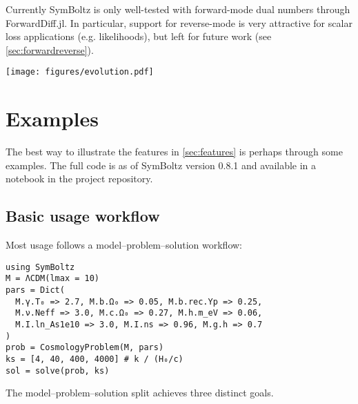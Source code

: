 \documentclass{aa}
\begin{document}
Currently SymBoltz is only well-tested with forward-mode dual numbers through ForwardDiff.jl.
In particular, support for reverse-mode is very attractive for scalar loss applications (e.g. likelihoods), but left for future work (see \cref{sec:forwardreverse}).


\begin{figure*}
    \centering
    \texttt{[image: figures/evolution.pdf]}
    \caption{Included plot recipes in SymBoltz make it trivial to visualize \emph{any} symbolic variable or expression thereof from a solution of the Einstein-Boltzmann equations. This plot was made with one short line of code per subplot. Wavenumbers $k$ are in units of $H_0/c$.}
    \label{fig:output}
\end{figure*}


\section{Examples}
\label{sec:examples}

The best way to illustrate the features in \cref{sec:features} is perhaps through some examples.
The full code is as of SymBoltz version 0.8.1 and available in a notebook in the project repository.

\subsection{Basic usage workflow}

Most usage follows a model--problem--solution workflow:
\begin{codebox}
\begin{Verbatim}
using SymBoltz
M = ΛCDM(lmax = 10)
pars = Dict(
  M.γ.T₀ => 2.7, M.b.Ω₀ => 0.05, M.b.rec.Yp => 0.25,
  M.ν.Neff => 3.0, M.c.Ω₀ => 0.27, M.h.m_eV => 0.06,
  M.I.ln_As1e10 => 3.0, M.I.ns => 0.96, M.g.h => 0.7
)
prob = CosmologyProblem(M, pars)
ks = [4, 40, 400, 4000] # k / (H₀/c)
sol = solve(prob, ks)
\end{Verbatim}
\end{codebox}
The model--problem--solution split achieves three distinct goals.
\end{document}
